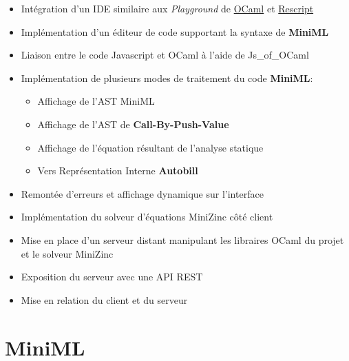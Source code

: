 \documentclass[12pt]{article}
\begin{document}
      \begin{itemize}
            \tightlist
            \item
                  Intégration d'un IDE similaire aux \emph{Playground} de
                  \href{https://OCaml.org/play}{OCaml} et
                  \href{https://rescript-lang.org/try}{Rescript}
            \item
                  Implémentation d'un éditeur de code supportant la syntaxe de
                  \textbf{MiniML}
            \item
                  Liaison entre le code Javascript et OCaml à l'aide de Js\_of\_OCaml
            \item
                  Implémentation de plusieurs modes de traitement du code
                  \textbf{MiniML}:

                  \begin{itemize}
                        \tightlist
                        \item
                              Affichage de l'AST MiniML
                        \item
                              Affichage de l'AST de \textbf{Call-By-Push-Value}
                        \item
                              Affichage de l'équation résultant de l'analyse statique
                        \item
                              Vers Représentation Interne \textbf{Autobill}
                  \end{itemize}
            \item
                  Remontée d'erreurs et affichage dynamique sur l'interface
            \item
                  Implémentation du solveur d'équations MiniZinc côté client
            \item
                  Mise en place d'un serveur distant manipulant les libraires OCaml du
                  projet et le solveur MiniZinc
            \item
                  Exposition du serveur avec une API REST
            \item
                  Mise en relation du client et du serveur
      \end{itemize}
\fi
\newpage

\hypertarget{miniml}{%
      \section{MiniML}\label{miniml}}
\end{document}
